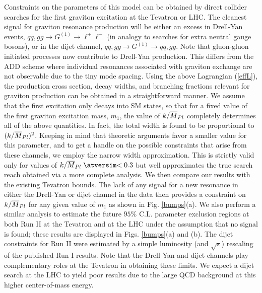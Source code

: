 Constraints on the parameters of this model can be obtained by direct 
collider searches for the first graviton excitation at the Tevatron or LHC. 
The cleanest signal for graviton resonance 
production will be either an excess in 
Drell-Yan events, $q\bar q,gg \to G^{(1)} \to \ell^+\ell^-$ (in analogy to
searches for extra neutral gauge bosons), or in the dijet channel, 
$q\bar q,gg \to G^{(1)} \to q\bar q,gg$.  
Note that gluon-gluon initiated processes 
now contribute to Drell-Yan production.  This differs from the ADD scheme
where individual resonances associated with graviton exchange are not
observable due to the tiny mode spacing.
Using the above Lagrangian 
(\ref{effL}), the production cross section, decay widths, and branching 
fractions relevant for graviton production can be obtained in a 
straightforward manner.  We assume that the first excitation only decays
into SM states, so that for a fixed value of the first graviton excitation 
mass, $m_1$, the value of $k/\mpl$ completely determines all of the above 
quantities.  In fact, the total width is found to be proportional to
$(k/\mpl)^2$.  Keeping in mind that theoretic
arguments favor a smaller value for this parameter, and to get a handle on the 
possible constraints that arise from these channels, we employ
the narrow width approximation.  This is strictly valid only for 
values of $k/\mpl\lsim 0.3$ but well approximates the true search reach 
obtained via a more complete analysis\cite{dhr}.  We then compare our results 
with the existing Tevatron bounds{\cite{tev}}.  The lack 
of any signal for a new resonance 
in either the Drell-Yan or dijet channel in the data 
then provides a constraint on $k/\mpl$ for any given value of $m_1$ as shown in 
Fig. \ref{bumps}(a).  We also perform a
similar analysis to estimate the future $95\%$ C.L. parameter
exclusion regions at both Run II at the Tevatron and at the LHC under the 
assumption that no signal is found; these results are displayed in 
Figs. \ref{bumps}(a) and (b).  The dijet constraints for Run II were estimated 
by a simple luminosity (and $\sqrt s$) rescaling of the published Run I results.
Note that the Drell-Yan and dijet channels play complementary roles at the
Tevatron in obtaining these limits.  We expect a dijet search at the LHC to
yield poor results due to the large QCD background at this higher
center-of-mass energy.


